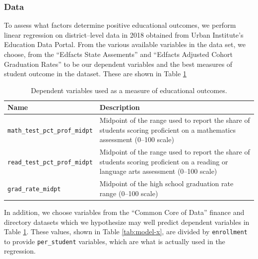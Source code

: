 \documentclass{article}
\begin{document}
\subsubsection{Data}
To assess what factors determine positive educational outcomes, we perform linear regression on district--level data in 2018 obtained from Urban Institute's Education Data Portal\autocite{urban}. From the various available variables in the data set, we choose, from the ``Edfacts State Assements'' and ``Edfacts Adjusted Cohort Graduation Rates'' to be our dependent variables and the best measures of student outcome in the dataset. These are shown in Table \ref{tab:model-y}
\begin{table}[h]
    \centering
    \begin{tabular}{lp{8cm}}
         \textbf{Name} & \textbf{Description} \\ \hline
         \texttt{math\_test\_pct\_prof\_midpt} & Midpoint of the range used to report the share of students scoring proficient on a mathematics assessment (0--100 scale) \\ \hline
         \texttt{read\_test\_pct\_prof\_midpt} & Midpoint of the range used to report the share of students scoring proficient on a reading or language arts assessment (0--100 scale) \\ \hline
         \texttt{grad\_rate\_midpt} & Midpoint of the high school graduation rate range (0--100 scale)
    \end{tabular}
    \caption{Dependent variables used as a measure of educational outcomes.}
    \label{tab:model-y}
\end{table}

In addition, we choose variables from the ``Common Core of Data'' finance and directory datasets which we hypothesize may well predict dependent variables in Table \ref{tab:model-y}. These values, shown in Table \ref{tab:model-x}, are {divided by \texttt{enrollment} to provide \texttt{per\_student} variables}, which are what is actually used in the regression.
\end{document}
